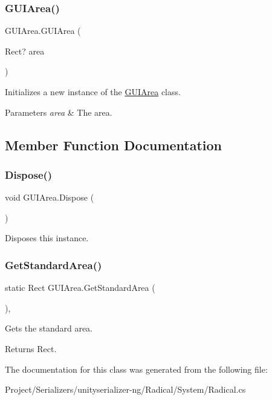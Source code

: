 \subsubsection{\texorpdfstring{G\+U\+I\+Area()}{GUIArea()}\hspace{0.1cm}{\footnotesize\ttfamily [2/2]}}
{\footnotesize\ttfamily G\+U\+I\+Area.\+G\+U\+I\+Area (\begin{DoxyParamCaption}\item[{Rect?}]{area }\end{DoxyParamCaption})\hspace{0.3cm}{\ttfamily [inline]}}



Initializes a new instance of the \hyperlink{class_g_u_i_area}{G\+U\+I\+Area} class. 


\begin{DoxyParams}{Parameters}
{\em area} & The area.\\
\hline
\end{DoxyParams}


\subsection{Member Function Documentation}
\mbox{\label{class_g_u_i_area_a984f752358d120763927e638d90afd02}} 
\subsubsection{\texorpdfstring{Dispose()}{Dispose()}}
{\footnotesize\ttfamily void G\+U\+I\+Area.\+Dispose (\begin{DoxyParamCaption}{ }\end{DoxyParamCaption})\hspace{0.3cm}{\ttfamily [inline]}}



Disposes this instance. 

\mbox{\label{class_g_u_i_area_a0bcc0000d655b0b70cea49c88a843729}} 
\subsubsection{\texorpdfstring{Get\+Standard\+Area()}{GetStandardArea()}}
{\footnotesize\ttfamily static Rect G\+U\+I\+Area.\+Get\+Standard\+Area (\begin{DoxyParamCaption}{ }\end{DoxyParamCaption})\hspace{0.3cm}{\ttfamily [inline]}, {\ttfamily [static]}}



Gets the standard area. 

\begin{DoxyReturn}{Returns}
Rect.
\end{DoxyReturn}


The documentation for this class was generated from the following file\+:\begin{DoxyCompactItemize}
\item 
Project/\+Serializers/unityserializer-\/ng/\+Radical/\+System/Radical.\+cs\end{DoxyCompactItemize}
